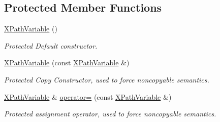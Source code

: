 \subsection*{Protected Member Functions}
\begin{DoxyCompactItemize}
\item 
\hypertarget{classphys_1_1xml_1_1XPathVariable_a8dd3bc4deb8cebad6796ffa10bbbcb21}{
\hyperlink{classphys_1_1xml_1_1XPathVariable_a8dd3bc4deb8cebad6796ffa10bbbcb21}{XPathVariable} ()}
\label{df/dee/classphys_1_1xml_1_1XPathVariable_a8dd3bc4deb8cebad6796ffa10bbbcb21}

\begin{DoxyCompactList}\small\item\em Protected Default constructor. \item\end{DoxyCompactList}\item 
\hypertarget{classphys_1_1xml_1_1XPathVariable_a37a47c3f05c4509f83193c1fa1c355e5}{
\hyperlink{classphys_1_1xml_1_1XPathVariable_a37a47c3f05c4509f83193c1fa1c355e5}{XPathVariable} (const \hyperlink{classphys_1_1xml_1_1XPathVariable}{XPathVariable} \&)}
\label{df/dee/classphys_1_1xml_1_1XPathVariable_a37a47c3f05c4509f83193c1fa1c355e5}

\begin{DoxyCompactList}\small\item\em Protected Copy Constructor, used to force noncopyable semantics. \item\end{DoxyCompactList}\item 
\hyperlink{classphys_1_1xml_1_1XPathVariable}{XPathVariable} \& \hyperlink{classphys_1_1xml_1_1XPathVariable_aa0d4555101b253e1864a5226dd098ad3}{operator=} (const \hyperlink{classphys_1_1xml_1_1XPathVariable}{XPathVariable} \&)
\begin{DoxyCompactList}\small\item\em Protected assignment operator, used to force noncopyable semantics. \item\end{DoxyCompactList}\end{DoxyCompactItemize}
